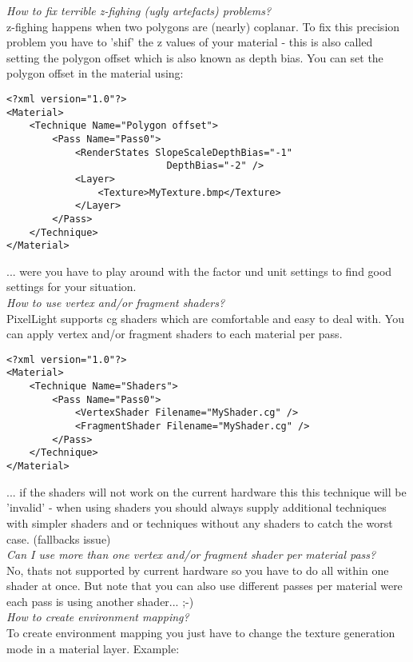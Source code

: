 \emph{How to fix terrible z-fighing (ugly artefacts) problems?}\\
z-fighing happens when two polygons are (nearly) coplanar. To fix this precision problem you have
to 'shif' the z values of your material - this is also called setting the polygon offset which is
also known as depth bias. You can set the polygon offset in the material using:\\

\begin{lstlisting}[caption=Polygon offset]
<?xml version="1.0"?>
<Material>
	<Technique Name="Polygon offset">
		<Pass Name="Pass0">
			<RenderStates SlopeScaleDepthBias="-1" 
							DepthBias="-2" />
			<Layer>
				<Texture>MyTexture.bmp</Texture>
			</Layer>
		</Pass>
	</Technique>
</Material>
\end{lstlisting}

... were you have to play around with the factor und unit settings to find good settings for your
situation.\\


\emph{How to use vertex and/or fragment shaders?}\\
PixelLight supports cg shaders which are comfortable and easy to deal with. You can apply vertex
and/or fragment shaders to each material per pass.\\

\begin{lstlisting}[caption=Material and shaders]
<?xml version="1.0"?>
<Material>
	<Technique Name="Shaders">
		<Pass Name="Pass0">
			<VertexShader Filename="MyShader.cg" />
			<FragmentShader Filename="MyShader.cg" />
		</Pass>
	</Technique>
</Material>
\end{lstlisting}

... if the shaders will not work on the current hardware this this technique will be 'invalid'
- when using shaders you should always supply additional techniques with simpler shaders and or
techniques without any shaders to catch the worst case. (fallbacks issue)\\


\emph{Can I use more than one vertex and/or fragment shader per material pass?}\\
No, thats not supported by current hardware so you have to do all within one shader at once.
But note that you can also use different passes per material were each pass is using another
shader... ;-)\\


\emph{How to create environment mapping?}\\
To create environment mapping you just have to change the texture generation mode in a material 
layer. Example:\\

